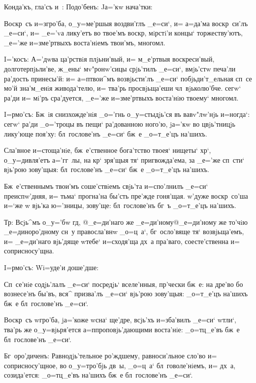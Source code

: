 Конда'къ, гла'съ и~: Подо'бенъ: Jа='кw нача'тки:

Воскр~съ и=з\ъ гро'ба, о_у=ме'ршыя воздви'глъ _е=си`, 
и= а=да'ма воскр~си'лъ _е=си`, и= _е='vа лику'етъ во 
твое'мъ воскр, мiрстi'и концы` торжеству'ютъ, _е='же 
и=з\ъ ме'ртвыхъ воста'нiемъ твои'мъ, многомл.

I='косъ: А='дwва ца'рствiя плjьни'вый, и= м_е'ртвыя 
воскреси'вый, долготерпjьли'ве, ж_ены` мv"ронw'сицы 
срjь'тилъ _е=си`, вмjь'стw печа'ли ра'дость принесы'й: и= 
а=п твои^мъ возвjьсти'лъ _е=си` побjьди'т_ельная 
сп~се мо'й зна'м_енiя живода'телю, и= тва'рь 
просвjьща'еши чл~вjьколю'бче. сегw` ра'ди и= мi'ръ 
сра'дуется, _е='же и=з\ъ ме'ртвыхъ воста'нiю твоему` 
многомл.


I=рмо'съ: Бж~iя снизхожде'нiя _о='гнь о_у=стыдjь'ся въ 
вавv"лw'нjь и=ногда`: сегw` ра'ди _о='троцы въ пещи` 
ра'дованною ного'ю, jа='кw во цвjь'тницjь лику'юще 
поя'ху: бл~гослове'нъ _е=си` бж~е _о=т_е'цъ на'шихъ.

Сла'вное и=стоща'нiе, бж~е'ственное бога'тство твоея` 
нищеты` хр`, о_у=дивля'етъ а='гг~лы, на кр` 
зря'щыя тя` пригвожда'ема, за _е='же сп~сти` вjь'рою 
зову'щыя: бл~гослове'нъ _е=си` бж~е _о=т_е'цъ на'шихъ.

Бж~е'ственнымъ твои'мъ соше'ствiемъ свjь'та 
и=спо'лнилъ _е=си` преиспw'дняя, и= тьма` прогна'на 
бы'сть пре'жде гоня'щая. w'дуже воскр~со'ша и=`же w\т 
вjь'ка ю='зницы, зову'ще: бл~гослове'нъ бг~ъ _о=т_е'цъ 
на'шихъ.

Тр: Всjь^мъ о_у='бw гд, @_е=ди'наго же 
_е=ди'ному@{_е=ди'ному же то'чiю} _е=диноро'дному сн~у 
правосла'внw _о=ц~а`, бг~осло'вяще тя` возвjьща'емъ, и= 
_е=ди'наго вjь'дяще w\т тебе` и=сходя'ща дх~а пра'ваго, 
соесте'ственна и= соприсносу'щна.

 I=рмо'съ: W\т i=уде'и доше'дше:

Сп~се'нiе содjь'лалъ _е=си` посредjь` вселе'нныя, 
пр'чески бж~е: на дре'во бо вознесе'нъ бы'въ, вся^ 
призва'лъ _е=си` вjь'рою зову'щыя: _о=т_е'цъ на'шихъ бж~е 
бл~гослове'нъ _е=си`.

Воскр~съ w\т гро'ба, jа='коже w\т сна` ще'дре, всjь'хъ 
и=зба'вилъ _е=си` w\т тли`, тва'рь же о_у=вjьря'ется 
а=п проповjь'дающими воста'нiе: _о=тц_е'въ бж~е 
бл~гослове'нъ _е=си`.

Бг~оро'диченъ: Равнодjь'тельное ро'ждшему, 
равноси'льное сло'во и= соприсносу'щное, во о_у=тро'бjь 
дв~ы, _о=ц~а` бл~говоле'нiемъ, и= дх~а, созида'ется: 
_о=тц_е'въ на'шихъ бж~е бл~гослове'нъ _е=си`.

